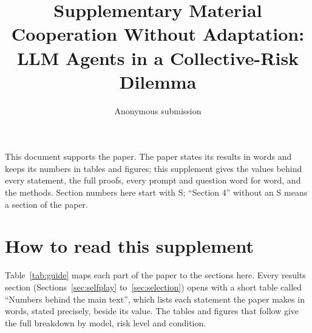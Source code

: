 \documentclass[10pt]{article}
\title{Supplementary Material\\[4pt]\large Cooperation Without Adaptation:\\
LLM Agents in a Collective-Risk Dilemma}
\author{Anonymous submission}
\date{}
\let\plainsection\section
\renewcommand{\section}{\FloatBarrier\needspace{12\baselineskip}\plainsection}  %
\begin{document}
\maketitle

\noindent This document supports the paper. The paper states its results in words and keeps its numbers in tables and figures; this supplement gives the values behind every statement, the full proofs, every prompt and question word for word, and the methods. Section numbers here start with S; ``Section 4'' without an S means a section of the paper.

\setcounter{tocdepth}{2}
{\small\tableofcontents}

\clearpage
\section{How to read this supplement}
\label{sec:guide}

Table~\ref{tab:guide} maps each part of the paper to the sections here. Every results section (Sections~\ref{sec:selfplay} to~\ref{sec:selection}) opens with a short table called ``Numbers behind the main text'', which lists each statement the paper makes in words, stated precisely, beside its value. The tables and figures that follow give the full breakdown by model, risk level and condition.
\end{document}
